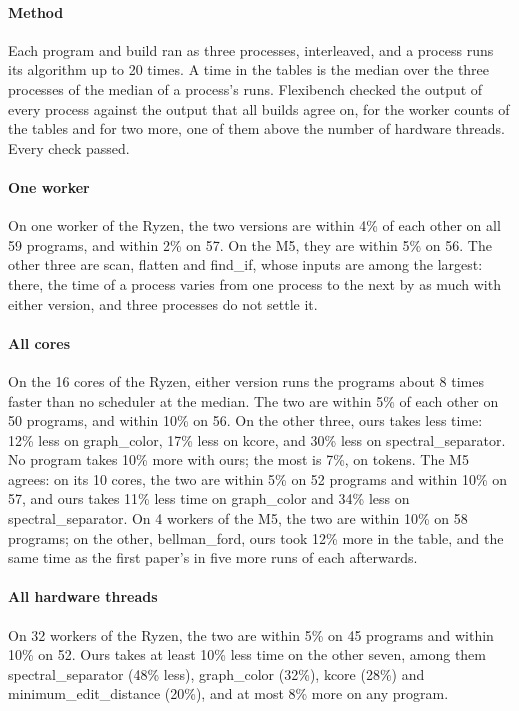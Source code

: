 \documentclass[sigplan,nonacm]{acmart}
\begin{document}
\paragraph{Method}
%
Each program and build ran as three processes, interleaved, and a
process runs its algorithm up to 20 times.
%
A time in the tables is the median over the three processes of the
median of a process's runs.
%
Flexibench checked the output of every process against the output that
all builds agree on, for the worker counts of the tables and for two
more, one of them above the number of hardware threads.
%
Every check passed.

\paragraph{One worker}
%
On one worker of the Ryzen, the two versions are within 4\% of each
other on all 59 programs, and within 2\% on 57.
%
On the M5, they are within 5\% on 56.
%
The other three are scan, flatten and find\_if, whose inputs are
among the largest: there, the time of a process varies from one
process to the next by as much with either version, and three
processes do not settle it.

\paragraph{All cores}
%
On the 16 cores of the Ryzen, either version runs the programs about
8 times faster than no scheduler at the median.
%
The two are within 5\% of each other on 50 programs, and within 10\%
on 56.
%
On the other three, ours takes less time: 12\% less on graph\_color,
17\% less on kcore, and 30\% less on spectral\_separator.
%
No program takes 10\% more with ours; the most is 7\%, on tokens.
%
The M5 agrees: on its 10 cores, the two are within 5\% on 52 programs
and within 10\% on 57, and ours takes 11\% less time on graph\_color
and 34\% less on spectral\_separator.
%
On 4 workers of the M5, the two are within 10\% on 58 programs; on
the other, bellman\_ford, ours took 12\% more in the table, and the
same time as the first paper's in five more runs of each afterwards.

\paragraph{All hardware threads}
%
On 32 workers of the Ryzen, the two are within 5\% on 45 programs and
within 10\% on 52.
%
Ours takes at least 10\% less time on the other seven, among them
spectral\_separator (48\% less), graph\_color (32\%), kcore (28\%) and
minimum\_edit\_distance (20\%), and at most 8\% more on any program.
\end{document}
